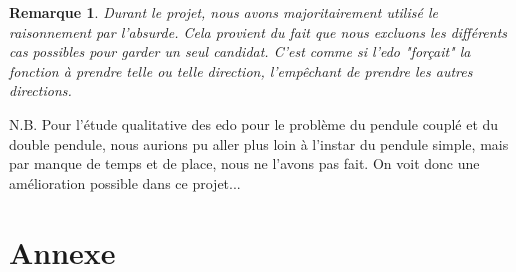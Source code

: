 \documentclass[9pt,a4paper]{article}
\newtheorem{rem}{Remarque}
\begin{document}
\begin{tcolorbox}
\begin{rem}
Durant le projet, nous avons majoritairement utilisé le raisonnement par l'absurde. Cela provient du fait que nous excluons les différents cas possibles pour garder un seul candidat. C'est comme si l'\gls{edo} "forçait" la fonction à prendre telle ou telle direction, l'empêchant de prendre les autres directions.
\end{rem}
\end{tcolorbox}

N.B. Pour l'étude qualitative des \gls{edo} pour le problème du pendule couplé et du double pendule, nous aurions pu aller plus loin à l'instar du pendule simple, mais par manque de temps et de place, nous ne l'avons pas fait. On voit donc une amélioration possible dans ce projet...
\newpage
\section{Annexe}
\end{document}
